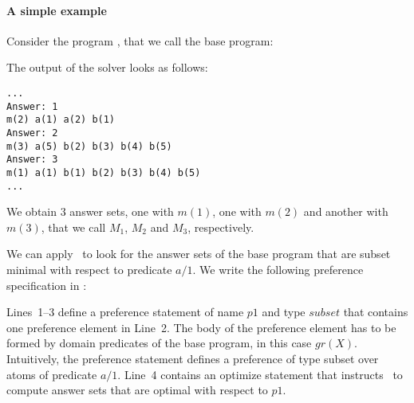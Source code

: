 

\paragraph{A simple example}

Consider the program
, 
that we call the base program:

The output of the solver looks as follows:
\begin{lstlisting}[numbers=none]
...
Answer: 1
m(2) a(1) a(2) b(1) 
Answer: 2
m(3) a(5) b(2) b(3) b(4) b(5) 
Answer: 3
m(1) a(1) b(1) b(2) b(3) b(4) b(5)
...
\end{lstlisting}
We obtain $3$ answer sets, one with $m(1)$, one with $m(2)$ and another with $m(3)$, 
that we call $M_1$, $M_2$ and $M_3$, respectively.

We can apply \asprin\ to look for the answer sets of the base program that are subset minimal with respect to predicate $a/1$. 
We write the following preference specification in  
: 

Lines~1--3 define a preference statement of name $p1$ and type $subset$ that contains one preference element in Line~2.
The body of the preference element has to be formed by domain predicates of the base program, in this case $gr(X)$.
Intuitively, the preference statement defines a preference of type subset over atoms of predicate $a/1$. 
Line~4 contains an optimize statement that instructs \asprin\ to compute answer sets that are optimal with respect to $p1$. 

